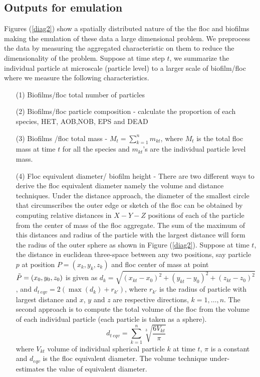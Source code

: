 \subsection{Outputs for emulation}\label{out1}
Figures (\ref{diag2}) show a spatially distributed nature of the the floc and biofilms making the emulation of these data a large dimensional problem. We preprocess the data by measuring the aggregated characteristic on them to reduce the dimensionality of the problem. Suppose at time step $t$, we summarize the individual particle at microscale (particle level) to a larger scale of biofilm/floc where we measure the following characteristics. 
\begin{itemize}
\item[(1)] Biofilms/floc total number of particles 
\item[(2)] Biofilms/floc particle composition  - calculate the proportion of each species, HET, AOB,NOB, EPS and DEAD
\item[(3)] Biofilms /floc total mass - $M_t =\sum \limits^n_{k=1} m_{kt}$, where $M_t$ is the total floc mass at time $t$ for all the species and $m_{kt}$'s are the individual particle level mass.
\item[(4)] Floc equivalent diameter/ biofilm height  -  There are two different ways to derive the floc equivalent diameter namely the volume and distance techniques. Under the distance approach, the diameter of the smallest circle that circumscribes the outer edge or sketch of the floc can be obtained by computing relative distances in $X-Y-Z$ positions of each of the particle from the center of mass of the floc aggregate. The sum of the maximum of this distances and radius of the particle with the largest distance will form the radius of the outer sphere as shown in Figure (\ref{diag2}). Suppose at time $t$, the distance in euclidean three-space between any two positions, say particle $p$ at position $P=(x_k,y_k,z_k)$ and floc center of mass at point ${\tilde {P}}=(x_0,y_0,z_0)$ is given as $d_{k}=\sqrt{(x_{kt}-x_0)^2+(y_{kt}-y_0)^2+(z_{kt}-z_0)^2}$, and $d_{t~eqv}=2(\max{(d_{k})}+r_{k'})$, where $r_{k'}$ is the radius of particle with largest distance and $x$, $y$ and $z$ are respective directions, $k=1,\ldots,n$. 
The second approach is to compute the total volume of the floc from the volume of each individual particle (each particle is taken as a sphere).
\begin{equation}
d_{t~eqv}=\sum^n_{k=1} \sqrt[3]{\frac{6V_{kt}}{\pi}}
\end{equation}
where $V_{kt}$ volume of individual spherical particle $k$ at time $t$, $\pi$ is a constant and $d_{eqv}$ is the floc equivalent diameter. The volume technique under-estimates the value of equivalent diameter.


\end{itemize}

